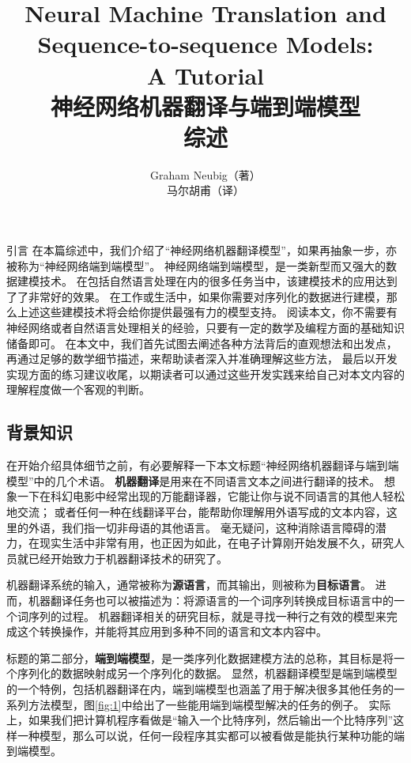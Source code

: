 \documentclass[10pt,a4paper]{ctexart}
\title{Neural Machine Translation and Sequence-to-sequence Models:\\A Tutorial \\ 神经网络机器翻译与端到端模型\\综述}
\author{Graham Neubig（著）\\马尔胡甫（译）}
\date{}
\makeatletter
\renewcommand{\section}{\@startsection{section}{1}{0mm}
  {-\baselineskip}{0.5\baselineskip}{\bf\leftline}}
\makeatother
\begin{document}
\maketitle

\newpage

\tableofcontents

\newpage

\section{引言}
在本篇综述中，我们介绍了“神经网络机器翻译模型”，如果再抽象一步，亦被称为“神经网络端到端模型”。
神经网络端到端模型，是一类新型而又强大的数据建模技术。
在包括自然语言处理在内的很多任务当中，该建模技术的应用达到了了非常好的效果。
在工作或生活中，如果你需要对序列化的数据进行建模，那么上述这些建模技术将会给你提供最强有力的模型支持。
阅读本文，你不需要有神经网络或者自然语言处理相关的经验，只要有一定的数学及编程方面的基础知识储备即可。
在本文中，我们首先试图去阐述各种方法背后的直观想法和出发点，再通过足够的数学细节描述，来帮助读者深入并准确理解这些方法，
最后以开发实现方面的练习建议收尾，以期读者可以通过这些开发实践来给自己对本文内容的理解程度做一个客观的判断。

\subsection{背景知识}
在开始介绍具体细节之前，有必要解释一下本文标题“神经网络机器翻译与端到端模型”中的几个术语。
\textbf{机器翻译}是用来在不同语言文本之间进行翻译的技术。
想象一下在科幻电影中经常出现的万能翻译器，它能让你与说不同语言的其他人轻松地交流；
或者任何一种在线翻译平台，能帮助你理解用外语写成的文本内容，这里的外语，我们指一切非母语的其他语言。
毫无疑问，这种消除语言障碍的潜力，在现实生活中非常有用，也正因为如此，在电子计算刚开始发展不久，研究人员就已经开始致力于机器翻译技术的研究了。

机器翻译系统的输入，通常被称为\textbf{源语言}，而其输出，则被称为\textbf{目标语言}。
进而，机器翻译任务也可以被描述为：将源语言的一个词序列转换成目标语言中的一个词序列的过程。
机器翻译相关的研究目标，就是寻找一种行之有效的模型来完成这个转换操作，并能将其应用到多种不同的语言和文本内容中。

标题的第二部分，\textbf{端到端模型}，是一类序列化数据建模方法的总称，其目标是将一个序列化的数据映射成另一个序列化的数据。
显然，机器翻译模型是端到端模型的一个特例，包括机器翻译在内，端到端模型也涵盖了用于解决很多其他任务的一系列方法模型，图\ref{fig:1}中给出了一些能用端到端模型解决的任务的例子。
实际上，如果我们把计算机程序看做是“输入一个比特序列，然后输出一个比特序列”这样一种模型，那么可以说，任何一段程序其实都可以被看做是能执行某种功能的端到端模型。
\end{document}

